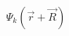 \documentclass[preview]{standalone}
\begin{document}
\begin{align*}
\Psi_k(\vec{r}+\vec{R})
\end{align*}
\end{document}

